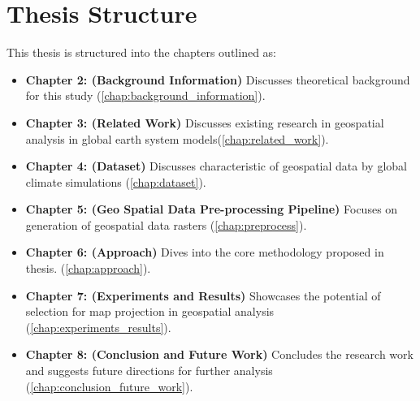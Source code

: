 \section{Thesis Structure}

This thesis is structured into the chapters outlined as:
\begin{itemize}
    \item \textbf{Chapter 2: (Background Information) } Discusses theoretical background for this study (\autoref{chap:background_information}).
    \item \textbf{Chapter 3: (Related Work) } Discusses existing research in geospatial analysis in global earth system models(\autoref{chap:related_work}).
    \item \textbf{Chapter 4: (Dataset)} Discusses characteristic of geospatial data by global climate simulations (\autoref{chap:dataset}).
    \item \textbf{Chapter 5: (Geo Spatial Data Pre-processing Pipeline)} Focuses on generation of geospatial data rasters  (\autoref{chap:preprocess}).
    \item \textbf{Chapter 6: (Approach)} Dives into the core methodology proposed in thesis.  (\autoref{chap:approach}).
    \item \textbf{Chapter 7: (Experiments and Results)} Showcases the potential of selection for map projection in geospatial analysis  (\autoref{chap:experiments_results}).
    \item \textbf{Chapter 8: (Conclusion and Future Work)} Concludes the research work and suggests future directions for further analysis  (\autoref{chap:conclusion_future_work}).
\end{itemize}

